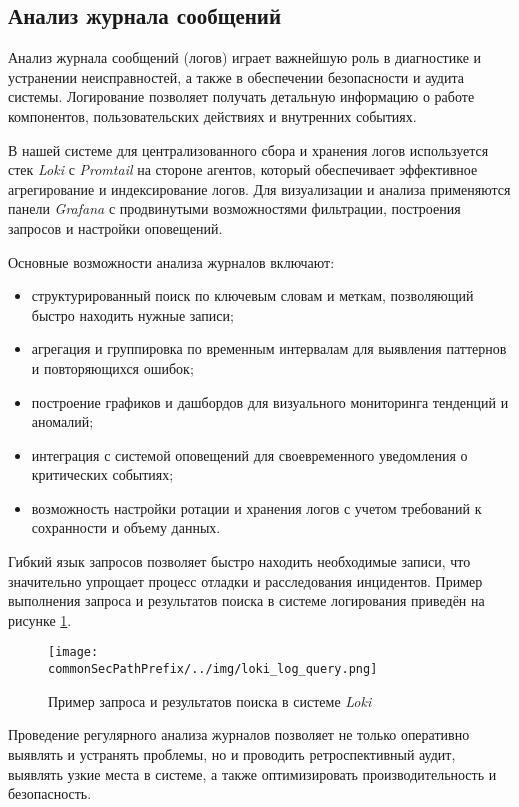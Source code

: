 \subsection{Анализ журнала сообщений}

Анализ журнала сообщений (логов) играет важнейшую роль в диагностике и устранении неисправностей, а также в обеспечении безопасности и аудита системы. Логирование позволяет получать детальную информацию о работе компонентов, пользовательских действиях и внутренних событиях.

В нашей системе для централизованного сбора и хранения логов используется стек \textit{Loki} с \textit{Promtail} на стороне агентов, который обеспечивает эффективное агрегирование и индексирование логов. Для визуализации и анализа применяются панели \textit{Grafana} с продвинутыми возможностями фильтрации, построения запросов и настройки оповещений.

Основные возможности анализа журналов включают:

\begin{itemize}
    \item структурированный поиск по ключевым словам и меткам, позволяющий быстро находить нужные записи;
    \item агрегация и группировка по временным интервалам для выявления паттернов и повторяющихся ошибок;
    \item построение графиков и дашбордов для визуального мониторинга тенденций и аномалий;
    \item интеграция с системой оповещений для своевременного уведомления о критических событиях;
    \item возможность настройки ротации и хранения логов с учетом требований к сохранности и объему данных.
\end{itemize}


Гибкий язык запросов позволяет быстро находить необходимые записи, что значительно упрощает процесс отладки и расследования инцидентов. Пример выполнения запроса и результатов поиска в системе логирования приведён на рисунке \ref{fig:loki_log_query}.

\begin{figure}[ht]
    \centering
    \texttt{[image: \\commonSecPathPrefix/../img/loki\_log\_query.png]}
    \caption{Пример запроса и результатов поиска в системе \textit{Loki}}
    \label{fig:loki_log_query}
\end{figure}

Проведение регулярного анализа журналов позволяет не только оперативно выявлять и устранять проблемы, но и проводить ретроспективный аудит, выявлять узкие места в системе, а также оптимизировать производительность и безопасность.

